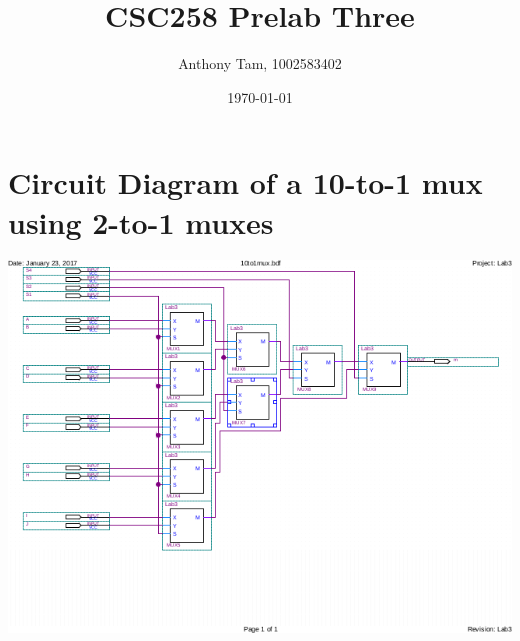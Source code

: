 \documentclass[11pt]{article}
\author{Anthony Tam, 1002583402}
\date{\today}
\title{CSC258 Prelab Three}
\begin{document}
\maketitle


\section{Circuit Diagram of a 10-to-1 mux using 2-to-1 muxes}
\label{sec-1}
\includegraphics{10to1mux.png}
\end{document}
